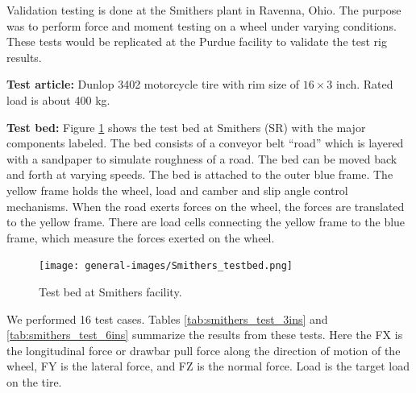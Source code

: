 \documentclass{article}
\begin{document}
Validation testing is done at the Smithers  plant in Ravenna, Ohio. The purpose was to perform force and moment testing on a wheel under varying conditions. These tests would be replicated at the Purdue facility to validate the test rig results. 

\textbf{Test article:} Dunlop 3402 motorcycle tire with rim size of $16\times3$ inch. Rated load is about 400 kg. 

\textbf{Test bed:} Figure \ref{fig:smithers_testbed} shows the test bed at Smithers  (SR) with the major components labeled. The bed consists of a conveyor belt “road” which is layered with a sandpaper to simulate roughness of a road. The bed can be moved back and forth at varying speeds. The bed is attached to the outer blue frame. The yellow frame holds the wheel, load and camber and slip angle control mechanisms. When the road exerts forces on the wheel, the forces are translated to the yellow frame. There are load cells connecting the yellow frame to the blue frame, which measure the forces exerted on the wheel.    

\begin{figure}[hbt!]
    \centering
    \texttt{[image: general-images/Smithers\_testbed.png]}
    \caption{Test bed at Smithers facility.}
    \label{fig:smithers_testbed}
\end{figure}

We performed 16 test cases. Tables \ref{tab:smithers_test_3ins} and \ref{tab:smithers_test_6ins} summarize the results from these tests. Here the FX is the longitudinal force or drawbar pull force along the direction of motion of the wheel, FY is the lateral force, and FZ is the normal force. Load is the target load on the tire. 
\end{document}
